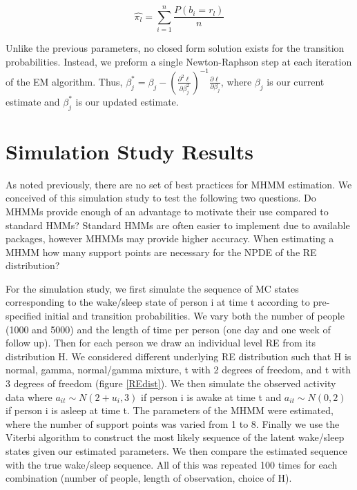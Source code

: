 \documentclass{article}
\begin{document}
\begin{equation}\label{pi}
    \hat{\pi_l} = \sum_{i = 1}^n \frac{P(b_i = r_l)}{n}
\end{equation}


Unlike the previous parameters, no closed form solution exists for the transition probabilities. Instead, we preform a single Newton-Raphson step at each iteration of the EM algorithm. Thus, $\beta_{j}^* = \beta_{j} - (\frac{\partial^2\ell}{\partial \beta_{j}^2})^{-1} \frac{\partial\ell}{\partial \beta_{j}}$, where $\beta_{j}$ is our current estimate and $\beta_{j}^*$ is our updated estimate. 

\newpage

\section{Simulation Study Results}\label{SimStudy}

As noted previously, there are no set of best practices for MHMM estimation.
We conceived of this simulation study to test the following two questions. 
Do MHMMs provide enough of an advantage to motivate their use compared to standard HMMs?
Standard HMMs are often easier to implement due to available packages, however MHMMs may provide higher accuracy. When estimating a MHMM how many 
support points are necessary for the NPDE of the RE distribution? 

For the simulation study, we first simulate the sequence of MC 
states corresponding to the wake/sleep state of person i at time 
t according to pre-specified initial and transition probabilities. 
We vary both the number of people (1000 and 5000) and the length 
of time per person (one day and one week of follow up). Then for 
each person we draw an individual level RE from its distribution H. 
We considered different underlying RE distribution such that H is 
normal, gamma, normal/gamma mixture, t with 2 degrees of freedom, 
and t with 3 degrees of freedom (figure \ref{REdist}). We then 
simulate the observed activity data where $a_{it} \sim N(2+u_i,3)$ 
if person i is awake at time t and $a_{it} \sim N(0,2)$ if person i 
is asleep at time t. The parameters of the MHMM were estimated, where 
the number of support points was varied from 1 to 8. Finally we use 
the Viterbi algorithm to construct the most likely sequence of the latent
wake/sleep states given our estimated parameters. We then compare 
the estimated sequence with the true wake/sleep sequence. All of this 
was repeated 100 times for each combination (number of people, length 
of observation, choice of H).
\end{document}
